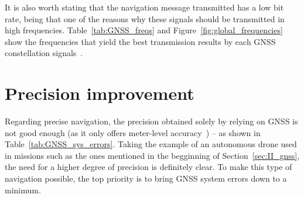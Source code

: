 


It is also worth stating that the navigation message transmitted has a low bit rate, being that one of the reasons why these signals should be transmitted in high frequencies. Table~\ref{tab:GNSS_freqs} and Figure~\ref{fig:global_frequencies} show the frequencies that yield the best transmission results by each GNSS constellation signals~\cite{novatel_gnss,kaplan_2017,groves_2008}.



\section{Precision improvement}\label{sec:II_gnssAug}

Regarding precise navigation, the precision obtained solely by relying on GNSS is not good enough (as it only offers meter-level accuracy~\cite{novatel_gnss}) -- as shown in Table~\ref{tab:GNSS_sys_errors}. Taking the example of an autonomous drone used in missions such as the ones mentioned in the begginning of Section~\ref{sec:II_gnss}, the need for a higher degree of precision is definitely clear. To make this type of navigation possible, the top priority is to bring GNSS system errors down to a minimum.

